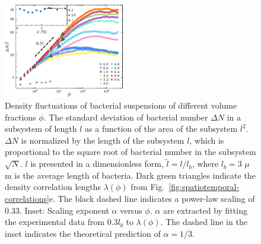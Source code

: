 \documentclass[twocolumn,aps,prx,amsmath,amssymb,longbibliography,superscriptaddress]{revtex4-2}
\begin{document}
\begin{figure}[t]
	\begin{center}
		\includegraphics[width=0.47\textwidth]{Figures/fig-3.pdf}
		\caption[Concentration dependence of GNF.]
		{
			Density fluctuations of bacterial suspensions of different volume fractions $\phi$. The standard deviation of bacterial number $\Delta N$ in a subsystem of length $l$ as a function of the area of the subsystem $l^2$. $\Delta N$ is normalized by the length of the subsystem $l$, which is proportional to the square root of bacterial number in the subsystem $\sqrt N$. $l$ is presented in a dimensionless form, $\tilde{l} = l/l_b$, where $l_b = 3$ $\mu$m is the average length of bacteria. Dark green triangles indicate the density correlation lengths $\lambda(\phi)$ from Fig.~\ref{fig:spatiotemporal-correlations}e. The black dashed line indicates a power-law scaling of 0.33.
			Inset: Scaling exponent $\alpha$ versus $\phi$. $\alpha$ are extracted by fitting the experimental data from 0.3$l_b$ to $\lambda(\phi)$. The dashed line in the inset indicates the theoretical prediction of $\alpha=1/3$.
		}
		\label{fig:GNF}
	\end{center}
\end{figure}
\end{document}
